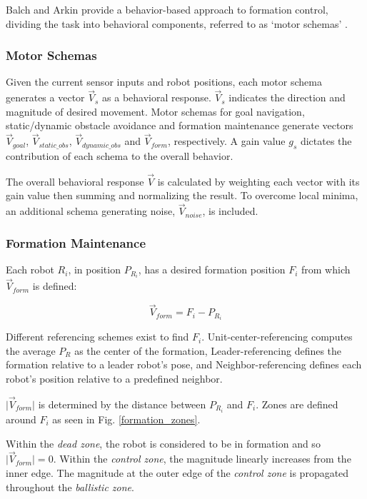 \documentclass[letterpaper, 10 pt, conference]{ieeeconf}  %
\begin{document}
Balch and Arkin provide a behavior-based approach to formation control, dividing the task into behavioral components, referred to as `motor schemas' \cite{c2}. 

\subsubsection*{Motor Schemas}

Given the current sensor inputs and robot positions, each motor schema generates a vector $\vec{V}_s$ as a behavioral response. $\vec{V}_s$ indicates the direction and magnitude of desired movement. Motor schemas for goal navigation, static/dynamic obstacle avoidance and formation maintenance generate vectors $\vec{V}_{goal}$, $\vec{V}_{static\_obs}$, $\vec{V}_{dynamic\_obs}$ and $\vec{V}_{form}$, respectively. A gain value $g_s$ dictates the contribution of each schema to the overall behavior.  

The overall behavioral response $\vec{V}$ is calculated by weighting each vector with its gain value then summing and normalizing the result. To overcome local minima, an additional schema generating noise,  $\vec{V}_{noise}$, is included.

\subsubsection*{Formation Maintenance}
Each robot $R_i$, in position $P_{R_i}$, has a desired formation position $F_i$ from which $\vec{V}_{form}$ is defined:

\[\vec{V}_{form} = F_i - P_{R_i}\]

Different referencing schemes exist to find $F_i$. Unit-center-referencing computes the average $P_R$ as the center of the formation, Leader-referencing defines the formation relative to a leader robot's pose, and Neighbor-referencing defines each robot's position relative to a predefined neighbor.

$\lvert\vec{V}_{form}\rvert$ is determined by the distance between $P_{R_i}$ and $F_i$. Zones are defined around $F_{i}$ as seen in Fig. \ref{formation_zones}. 

Within the \textit{dead zone}, the robot is considered to be in formation and so $\lvert\vec{V}_{form}\rvert = 0$. Within the \textit{control zone}, the magnitude linearly increases from the inner edge. The magnitude at the outer edge of the \textit{control zone} is propagated throughout the \textit{ballistic zone}.
\end{document}
